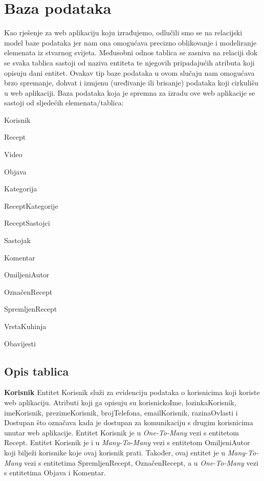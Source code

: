 \eject





\section{Baza podataka}


\textnormal{Kao rješenje za web aplikaciju koju izrađujemo, odlučili smo se na relacijski model baze podataka jer nam ona omogućava precizno oblikovanje i modeliranje elemenata iz stvarnog svijeta. Međusobni odnos tablica se zasniva na relaciji dok se svaka tablica sastoji od naziva entiteta te njegovih pripadajućih atributa koji opisuju dani entitet. Ovakav tip baze podataka u ovom slučaju nam omogućava brzo spremanje, dohvat i izmjenu (uređivanje ili brisanje) podataka koji cirkulišu u web aplikaciji. Baza podataka koja je spremna za izradu ove web aplikacije se sastoji od sljedećih elemenata/tablica:}

\begin{packed_item}

	\item Korisnik
	\item Recept
	\item Video
	\item Objava
	\item Kategorija
	\item ReceptKategorije
	\item ReceptSastojci
	\item Sastojak
	\item Komentar
	\item OmiljeniAutor
	\item OznačenRecept
	\item SpremljenRecept
	\item VrstaKuhinja
	\item Obavijesti

\end{packed_item}

\eject

\subsection{Opis tablica}


\textnormal{\textbf{Korisnik}		Entitet Korisnik služi za evidenciju podataka o korisnicima koji koriste web aplikaciju. Atributi koji ga opisuju su korisnickoIme, lozinkaKorisnik, imeKorisnik, prezimeKorisnik, brojTelefona, emailKorisnik, razinaOvlasti i Dostupan što označava kada je dostupan za komunikaciju s drugim korisnicima unutar web aplikacije. Entitet Korisnik je u \textit{One-To-Many} vezi s entitetom Recept. Entitet Korisnik je i u \textit{Many-To-Many} vezi s entitetom OmiljeniAutor koji bilježi korisnike koje ovaj korisnik prati. Također, ovaj entitet je u \textit{Many-To-Many} vezi s entitetima SpremljenRecept, OznačenRecept, a u \textit{One-To-Many} vezi s entitetima Objava i Komentar.}


